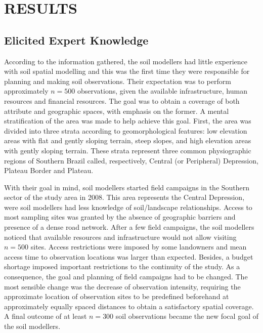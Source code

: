 \section{RESULTS}

\subsection{Elicited Expert Knowledge}

According to the information gathered, the soil modellers had little experience with soil spatial 
modelling and this was the first time they were responsible for planning and making soil observations. Their 
expectation was to perform approximately $n = 500$ observations, given the available infrastructure, human 
resources and financial resources. The goal was to obtain a  coverage of both attribute and 
geographic spaces, with emphasis on the former. A mental stratification of the area was made to help achieve 
this goal. First, the area was divided into three strata according to geomorphological features: low elevation 
areas with flat and gently sloping terrain, steep slopes, and high elevation areas with gently sloping 
terrain. These strata represent three common physiographic regions of Southern Brazil called, respectively, 
Central (or Peripheral) Depression, Plateau Border and Plateau.

With their goal in mind, soil modellers started field campaigns in the Southern sector of the study area in 
\num{2008}. This area represents the Central Depression, were soil modellers had less knowledge of 
soil\-/landscape relationships. Access to most sampling sites was granted by the absence of geographic 
barriers and presence of a dense road network. After a few field campaigns, the soil modellers noticed that 
available resources and infrastructure would not allow visiting $n = 500$ sites. Access restrictions were 
imposed by some landowners and mean access time to observation locations was larger than expected. Besides, a 
budget shortage imposed important restrictions to the continuity of the study. As a consequence, the goal and 
planning of field campaigns had to be changed. The most sensible change was the decrease of observation 
intensity, requiring the approximate location of observation sites to be predefined beforehand at 
approximately equally spaced distances to obtain a satisfactory spatial coverage. A final outcome of at least 
$n = 300$ soil observations became the new focal goal of the soil modellers.

